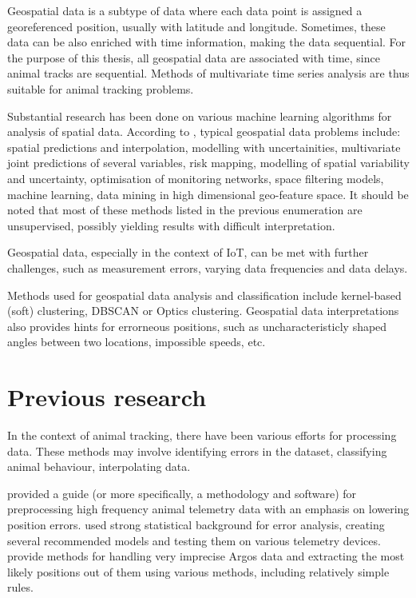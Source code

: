 Geospatial data is a subtype of data where each data point is assigned a georeferenced position, usually with latitude and longitude. Sometimes, these data can be also enriched with time information, making the data sequential. For the purpose of this thesis, all geospatial data are associated with time, since animal tracks are sequential. Methods of multivariate time series analysis are thus suitable for animal tracking problems.

Substantial research has been done on various machine learning algorithms for analysis of spatial data. According to \citeauthor{kanevski2008machine}, typical geospatial data problems include: spatial predictions and interpolation, modelling with uncertainities, multivariate joint predictions of several variables, risk mapping, modelling of spatial variability and uncertainty, optimisation of monitoring networks, space filtering models, machine learning, data mining in high dimensional geo-feature space. It should be noted that most of these methods listed in the previous enumeration are unsupervised, possibly yielding results with difficult interpretation.

Geospatial data, especially in the context of IoT, can be met with further challenges, such as measurement errors, varying data frequencies and data delays.

Methods used for geospatial data analysis and classification include kernel-based (soft) clustering, DBSCAN or Optics clustering. Geospatial data interpretations also provides hints for errorneous positions, such as uncharacteristicly shaped angles between two locations, impossible speeds, etc.

\section{Previous research}
\label{previous-researc-section}

In the context of animal tracking, there have been various efforts for processing data. These methods may involve identifying errors in the dataset, classifying animal behaviour, interpolating data.

\citeauthor{gupte2022guide} provided a guide (or more specifically, a methodology and software) for preprocessing high frequency animal telemetry data with an emphasis on lowering position errors. \citeauthor{fleming2021comprehensive} used strong statistical background for error analysis, creating several recommended models and testing them on various telemetry devices. \citeauthor{douglas2012moderating} provide methods for handling very imprecise Argos data and extracting the most likely positions out of them using various methods, including relatively simple rules.

